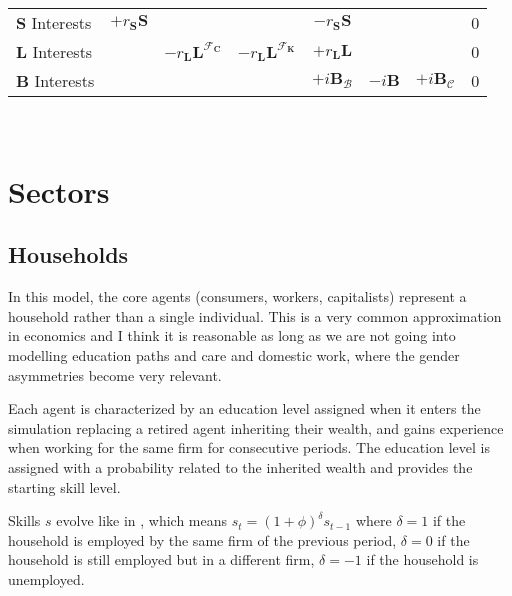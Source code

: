 \documentclass[a4paper, headings=standardclasses]{scrartcl}
\begin{document}
{\begin{tabularx}{\textwidth}{@{} Y|cccccc|l @{}}
		\midrule
		$\mathbf{S}$ Interests & $+r_{\mathbf{S}} \mathbf{S}$             &                                                         &                                                                        & $-r_{\mathbf{S}} \mathbf{S}$ &                                          &                             & 0    \\
		$\mathbf{L}$ Interests &                                          & $-r_{\mathbf{L}} \mathbf{L}^{\mathcal{F}_{\mathbf{C}}}$ & $-r_{\mathbf{L}} \mathbf{L}^{\mathcal{F}_{\mathbf{K}}}$                & $+r_{\mathbf{L}} \mathbf{L}$ &                                          &                             & 0    \\
		$\mathbf{B}$ Interests &                                          &                                                         &                                                                        & $+i \mathbf{B}_\mathcal{B}$  & $-i \mathbf{B}$                          & $+i \mathbf{B}_\mathcal{C}$ & 0    \\
		\bottomrule
	\end{tabularx}
}\\

\section{Sectors}
\subsection{Households}
In this model, the core agents (consumers, workers, capitalists) represent a household rather than a single individual. This is a very common approximation in economics and I think it is reasonable as long as we are not going into modelling education paths and care and domestic work, where the gender asymmetries become very relevant.

Each agent is characterized by an education level assigned when it enters the simulation replacing a retired agent inheriting their wealth, and gains experience when working for the same firm for consecutive periods.
The education level is assigned with a probability related to the inherited wealth and provides the starting skill level.

Skills $s$ evolve like in \textcite{dosi2018}, which means $s_t = (1+\phi)^\delta s_{t-1}$ where $\delta=1$ if the household is employed by the same firm of the previous period, $\delta=0$ if the household is still employed but in a different firm, $\delta=-1$ if the household is unemployed.
\end{document}
